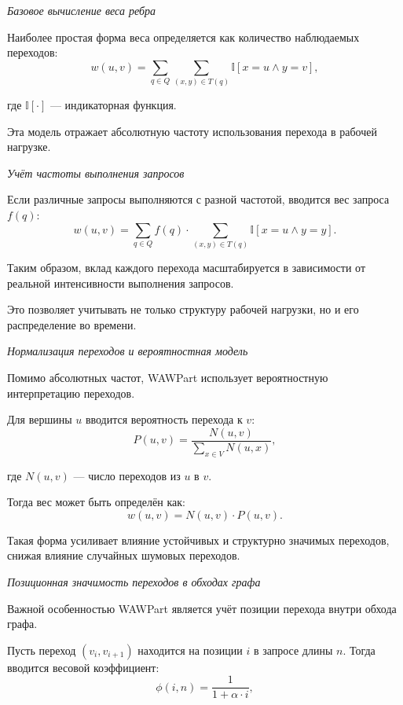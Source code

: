 \textit{Базовое вычисление веса ребра}

Наиболее простая форма веса определяется как количество наблюдаемых переходов:
\begin{equation*}
w(u,v) = \sum_{q \in Q} \sum_{(x,y)\in T(q)} \mathbb{I}[x=u \land y=v],
\end{equation*}

где $\mathbb{I}[\cdot]$ --- индикаторная функция.

Эта модель отражает абсолютную частоту использования перехода в рабочей нагрузке.

\textit{Учёт частоты выполнения запросов}

Если различные запросы выполняются с разной частотой, вводится вес запроса $f(q)$:
\begin{equation*}
w(u,v) = \sum_{q \in Q} f(q)\cdot \sum_{(x,y)\in T(q)} \mathbb{I}[x=u \land y=y].
\end{equation*}

Таким образом, вклад каждого перехода масштабируется в зависимости от реальной интенсивности выполнения запросов.

Это позволяет учитывать не только структуру рабочей нагрузки, но и его распределение во времени.

\textit{Нормализация переходов и вероятностная модель}

Помимо абсолютных частот, WAWPart использует вероятностную интерпретацию переходов.

Для вершины $u$ вводится вероятность перехода к $v$:
\begin{equation*}
P(u,v) = \frac{N(u,v)}{\sum_{x \in V} N(u,x)},
\end{equation*}

где $N(u,v)$ --- число переходов из $u$ в $v$.

Тогда вес может быть определён как:
\begin{equation*}
w(u,v) = N(u,v)\cdot P(u,v).
\end{equation*}

Такая форма усиливает влияние устойчивых и структурно значимых переходов, снижая влияние случайных шумовых переходов.

\textit{Позиционная значимость переходов в обходах графа}

Важной особенностью WAWPart является учёт позиции перехода внутри обхода графа.

Пусть переход $(v_i, v_{i+1})$ находится на позиции $i$ в запросе длины $n$. Тогда вводится весовой коэффициент:
\begin{equation*}
\phi(i,n) = \frac{1}{1 + \alpha \cdot i},
\end{equation*}

